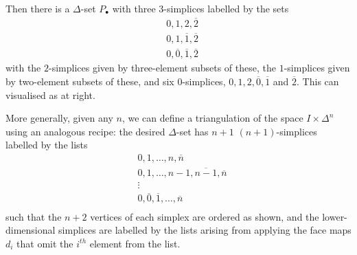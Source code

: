 \documentclass{tufte-handout}
\theoremstyle{definition}
\begin{document}
Then there is a $\Delta$-set $P_\bullet$ with three $3$-simplices 
labelled by the sets 
\begin{align*}
& 0,1,2,\overline{2}\\
& 0,1,\overline{1},\overline{2}\\
& 0,\overline{0},\overline{1},\overline{2}
\end{align*}
with
\marginnote[-2cm]{\begin{tikzpicture}[scale=0.6]%

\draw [name path=f1,opacity=0] (0,0) node[left] {$0$} -- (5,0) -- (5,5) -- (0,5) -- cycle;
\draw (0,5) -- (2,4) -- (0,0);
\draw (0,5) -- (2,8.5) -- (5,5);
\draw [name path=f2,opacity=0] (5,5) -- (0,0);
\draw (2,4) -- (5,5);
\draw [name path=b1] (2,8.5) -- (2,4) ;
\draw [name path=b2] (2,4) -- (5,0);
\path [name intersections = {of=f1 and b1,by=inter1}];
\path [name intersections = {of=f2 and b2,by=inter2}];
\filldraw [white] (inter1) circle (3pt);
\filldraw [white] (inter2) circle (3pt);
\draw (0,0) -- (5,0) -- (5,5) -- (0,5) -- cycle;
\draw (5,5) -- (0,0);

\node[label=50:$0$] at (2,4) {};
\node[left] at (0,0) {$1$};
\node[right] at (5,0) {$2$};

\node[above right] at (2,8.5) {$\overline{0}$};
\node[left] at (0,5) {$\overline{1}$};
\node[right] at (5,5) {$\overline{2}$};
\end{tikzpicture}} 
the $2$-simplices given by three-element subsets of these, the $1$-simplices given by two-element
subsets of these, and six $0$-simplices,
$0, 1, 2, \overline{0},\overline{1}$ and $\overline{2}$. This can visualised as at right.

More generally, given any $n$, we can define a triangulation of the space $I\times \Delta^n$ using an 
analogous recipe: the desired $\Delta$-set has $n+1$ $(n+1)$-simplices labelled by the lists
\begin{align*}
& 0,1,\ldots, n,\overline{n}\\
& 0,1,\ldots,n-1,\overline{n-1},\overline{n}\\
&\vdots\\
& 0,\overline{0},\overline{1},\ldots,\overline{n}\\
\end{align*}
such that the $n+2$ vertices of each simplex are ordered as shown,
and the lower-dimensional simplices are labelled by the lists arising from applying the face 
maps $d_i$ that omit the $i^{th}$ element from the list.
\end{document}
